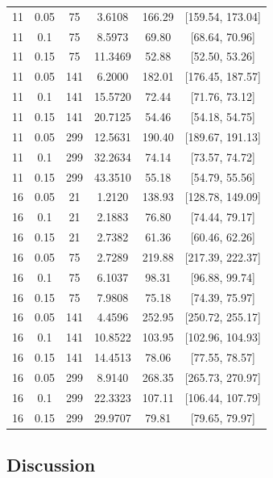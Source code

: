 \documentclass[10pt,a4paper]{article}
\begin{document}
\begin{center}
\begin{longtable}{cccccc}
    11 & 0.05 & 75 & 3.6108 & 166.29 & [159.54, 173.04]\\
    11 & 0.1 & 75 & 8.5973 & 69.80 & [68.64, 70.96] \\
    11 & 0.15 & 75 & 11.3469 & 52.88 & [52.50, 53.26] \\
    11 & 0.05 & 141 & 6.2000 & 182.01 & [176.45, 187.57] \\
    11 & 0.1 & 141 & 15.5720 & 72.44 & [71.76, 73.12]\\
    11 & 0.15 & 141 & 20.7125 & 54.46 & [54.18, 54.75] \\
    11 & 0.05 & 299 & 12.5631 & 190.40 & [189.67, 191.13] \\
    11 & 0.1 & 299 & 32.2634 & 74.14 & [73.57, 74.72] \\
    11 & 0.15 & 299 & 43.3510 & 55.18 & [54.79, 55.56] \\
    16 & 0.05 & 21 & 1.2120 & 138.93 & [128.78, 149.09]\\
    16 & 0.1 & 21 & 2.1883 & 76.80 & [74.44, 79.17]\\
    16 & 0.15 & 21 & 2.7382 & 61.36 & [60.46, 62.26] \\
    16 & 0.05 & 75 & 2.7289 & 219.88 & [217.39, 222.37]\\
    16 & 0.1 & 75 & 6.1037 & 98.31 & [96.88, 99.74] \\
    16 & 0.15 & 75 & 7.9808 & 75.18 & [74.39, 75.97] \\
    16 & 0.05 & 141 & 4.4596 & 252.95 & [250.72, 255.17] \\
    16 & 0.1 & 141 & 10.8522 & 103.95 & [102.96, 104.93]\\
    16 & 0.15 & 141 & 14.4513 & 78.06 & [77.55, 78.57] \\
    16 & 0.05 & 299 & 8.9140 & 268.35 & [265.73, 270.97] \\
    16 & 0.1 & 299 & 22.3323 & 107.11 & [106.44, 107.79] \\
    16 & 0.15 & 299 & 29.9707 & 79.81 & [79.65, 79.97] \\
    \end{longtable}
\end{center}
\subsection*{Discussion}
\end{document}
